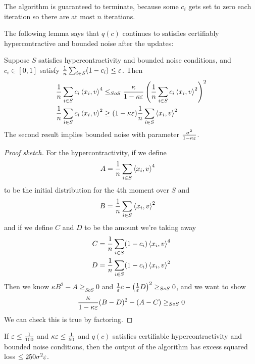 The algorithm is guaranteed to terminate, because some $c_i$ gets set to zero
each iteration so there are at most $n$ iterations.

The following lemma says that $q(c)$ continues to satisfies certifiably
hypercontractive and bounded noise after the updates:
\begin{lemma}
  Suppose $S$ satisfies hypercontractivity and bounded noise conditions,
  and $c_i \in [0,1]$ satisfy $\frac{1}{n}  \sum_{i \in S} (1 - c_i) \leq \varepsilon$.
  Then
  \begin{align}
    \frac{1}{n} \sum_{i \in S} c_i \braket{x_i, v}^4 
    &\leq_{SoS} \frac{\kappa}{1 - \kappa \varepsilon} \left(
      \frac{1}{n} \sum_{i \in S} c_i \braket{x_i, v}^2
    \right)^2 \\
    \frac{1}{n}  \sum_{i \in S} c_i \braket{x_i, v}^2
    &\geq (1 - \kappa \varepsilon) \frac{1}{n}  \sum_{i \in S} \braket{x_i, v}^2
  \end{align}
  The second result implies bounded noise with parameter $\frac{\sigma^2}{1 - \kappa \varepsilon}
  $.
\end{lemma}

\begin{proof}[Proof sketch]
  For the hypercontractivity, if we define 
  \begin{align}
    A &= \frac{1}{n}  \sum_{i \in S} \braket{x_i, v}^4
  \end{align}
  to be the initial distribution for the $4$th moment over $S$
  and 
  \begin{align}
    B &= \frac{1}{n} \sum_{i \in S} \braket{x_i, v}^2
  \end{align}
  and if we define $C$ and $D$ to be the amount we're taking away
  \begin{align}
    C &= \frac{1}{n}  \sum_{i \in S} (1 - c_i) \braket{x_i, v}^4 \\
    D &= \frac{1}{n}  \sum_{i \in S} (1 - c_i) \braket{x_i, v}^2
  \end{align}
  Then we know $\kappa B^2 - A \geq_{SoS} 0$ and 
  $\frac{1}{\varepsilon} c - \left(\frac{1}{\varepsilon} D \right)^2 \geq_{SoS} 0$,
  and we want to show
  \begin{align}
    \frac{\kappa}{1 - \kappa \varepsilon}(B - D)^2 - (A - C)  \geq_{SoS} 0
  \end{align}
  We can check this is true by factoring.
\end{proof}

\begin{proposition}
  If $\varepsilon \leq \frac{1}{100}$ and $\kappa \varepsilon \leq \frac{1}{50}$
  and $q(c)$ satisfies certifiable hypercontractivity and bounded
  noise conditions, then the output of the algorithm has
  excess squared loss $\leq 250 \sigma^2 \varepsilon$.
\end{proposition}

